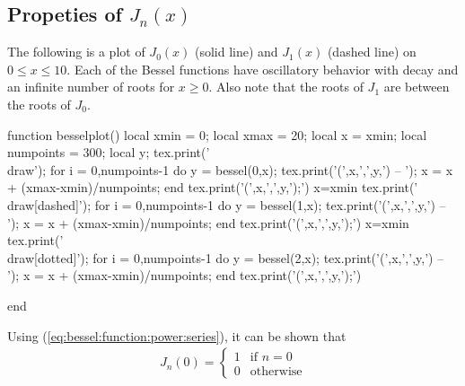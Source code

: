 \subsection{Propeties of $J_n(x)$}

The following is a plot of $J_0(x)$ (solid line) and $J_1(x)$ (dashed line) on $0 \leq x \leq 10$.  Each of the Bessel functions have oscillatory behavior with decay and an infinite number of roots for $x \geq 0$.    Also note that the roots of $J_1$ are between the roots of $J_0$.  

\begin{luacode}
function besselplot()
  local xmin = 0;
  local xmax = 20; 
  local x = xmin;
  local numpoints = 300;
  local y; 
  tex.print('\\draw');
  for i = 0,numpoints-1 do
    y = bessel(0,x);
    tex.print('(',x,',',y,') -- ');
    x = x + (xmax-xmin)/numpoints;
  end
  tex.print('(',x,',',y,');')
  x=xmin
  tex.print('\\draw[dashed]');
  for i = 0,numpoints-1 do
    y = bessel(1,x);
    tex.print('(',x,',',y,') -- ');
    x = x + (xmax-xmin)/numpoints;
  end
  tex.print('(',x,',',y,');')
  x=xmin
  tex.print('\\draw[dotted]');
  for i = 0,numpoints-1 do
    y = bessel(2,x);
    tex.print('(',x,',',y,') -- ');
    x = x + (xmax-xmin)/numpoints;
  end
  tex.print('(',x,',',y,');')

end
\end{luacode}
\newcommand{\bplot}{\directlua{besselplot()}}

\begin{center}
\end{center}

Using (\ref{eq:bessel:function:power:series}), it can be shown that 
%
\begin{align*}
J_n(0) = \begin{cases}
1 & \text{if $n=0$} \\
0 & \text{otherwise}  
\end{cases}
\end{align*}

